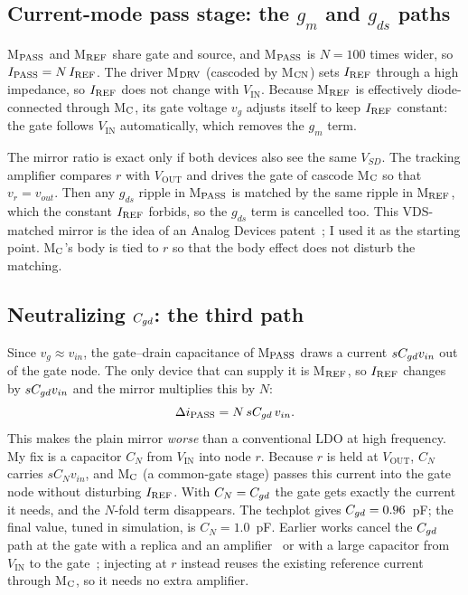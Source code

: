 \documentclass[conference]{IEEEtran}
\newcommand{\Vin}{V_{\mathrm{IN}}}\newcommand{\Vout}{V_{\mathrm{OUT}}}
\begin{document}
\subsection{Current-mode pass stage: the $g_m$ and $g_{ds}$ paths}
M$_{\rm PASS}$ and M$_{\rm REF}$ share gate and source, and M$_{\rm PASS}$ is $N=100$ times wider, so $I_{\rm PASS}=N\,I_{\rm REF}$. The driver M$_{\rm DRV}$ (cascoded by M$_{\rm CN}$) sets $I_{\rm REF}$ through a high impedance, so $I_{\rm REF}$ does not change with $\Vin$. Because M$_{\rm REF}$ is effectively diode-connected through M$_{\rm C}$, its gate voltage $v_g$ adjusts itself to keep $I_{\rm REF}$ constant: the gate follows $\Vin$ automatically, which removes the $g_m$ term.

The mirror ratio is exact only if both devices also see the same $V_{SD}$. The tracking amplifier compares $r$ with $\Vout$ and drives the gate of cascode M$_{\rm C}$ so that $v_r=v_{out}$. Then any $g_{ds}$ ripple in M$_{\rm PASS}$ is matched by the same ripple in M$_{\rm REF}$, which the constant $I_{\rm REF}$ forbids, so the $g_{ds}$ term is cancelled too. This VDS-matched mirror is the idea of an Analog Devices patent~\cite{adi}; I used it as the starting point. M$_{\rm C}$'s body is tied to $r$ so that the body effect does not disturb the matching.

\subsection{Neutralizing $C_{gd}$: the third path}
Since $v_g\approx v_{in}$, the gate--drain capacitance of M$_{\rm PASS}$ draws a current $sC_{gd} v_{in}$ out of the gate node. The only device that can supply it is M$_{\rm REF}$, so $I_{\rm REF}$ changes by $sC_{gd} v_{in}$ and the mirror multiplies this by $N$:
\begin{equation}
\Delta i_{\rm PASS} = N\,sC_{gd}\,v_{in}.
\end{equation}
This makes the plain mirror \emph{worse} than a conventional LDO at high frequency. My fix is a capacitor $C_N$ from $\Vin$ into node $r$. Because $r$ is held at $\Vout$, $C_N$ carries $sC_N v_{in}$, and M$_{\rm C}$ (a common-gate stage) passes this current into the gate node without disturbing $I_{\rm REF}$. With $C_N=C_{gd}$ the gate gets exactly the current it needs, and the $N$-fold term disappears. The techplot gives $C_{gd}=0.96$~pF; the final value, tuned in simulation, is $C_N=1.0$~pF. Earlier works cancel the $C_{gd}$ path at the gate with a replica and an amplifier~\cite{park} or with a large capacitor from $\Vin$ to the gate~\cite{lim}; injecting at $r$ instead reuses the existing reference current through M$_{\rm C}$, so it needs no extra amplifier.
\end{document}
